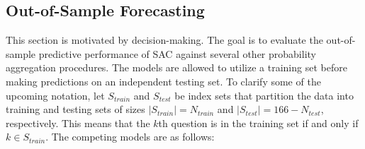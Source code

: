 \documentclass[aoas, preprint]{imsart}
\numberwithin{equation}{section}
\theoremstyle{plain}
\begin{document}
\subsection{Out-of-Sample Forecasting}
\label{forecasting}
This section is motivated by decision-making. 
The goal is to evaluate the out-of-sample predictive performance of SAC against several other probability aggregation procedures. The models are allowed to utilize a training set before making predictions on an independent testing set. To clarify some of the upcoming notation, let $S_{train}$ and $S_{test}$ be index sets that partition the data into training and testing sets of sizes $|S_{train}| = N_{train}$ and $|S_{test}| = 166 - N_{test}$, respectively. This means that the $k$th question is in the training set if and only if $k \in S_{train}$. The competing models are as follows:
\end{document}
